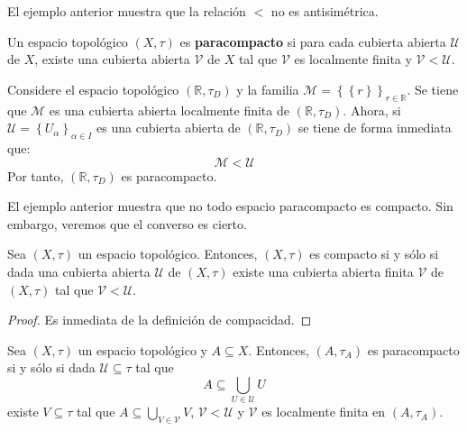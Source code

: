 \documentclass[12pt]{report}
\newcounter{it}
\theoremstyle{largebreak}
\begin{document}
    El ejemplo anterior muestra que la relación $<$ no es antisimétrica.

    \begin{mydef}
        Un espacio topológico $(X,\tau)$ es \textbf{paracompacto} si para cada cubierta abierta $\mathcal{U}$ de $X$, existe una cubierta abierta $\mathcal{V}$ de $X$ tal que $\mathcal{V}$ es localmente finita y $\mathcal{V}<\mathcal{U}$. 
    \end{mydef}

    \begin{exa}
        Considere el espacio topológico $(\mathbb{R},\tau_D)$ y la familia $\mathcal{M}=\left\{\left\{r\right\} \right\}_{ r\in \mathbb{R}}$. Se tiene que $\mathcal{M}$ es una cubierta abierta localmente finita de $(\mathbb{R},\tau_D)$. Ahora, si $\mathcal{U}=\left\{U_\alpha \right\}_{\alpha\in I}$ es una cubierta abierta de $(\mathbb{R},\tau_D)$ se tiene de forma inmediata que:
        \begin{equation*}
            \mathcal{M}<\mathcal{U}
        \end{equation*}
        Por tanto, $(\mathbb{R},\tau_D)$ es paracompacto.
    \end{exa}

    El ejemplo anterior muestra que no todo espacio paracompacto es compacto. Sin embargo, veremos que el converso es cierto.

    \begin{excer}
        Sea $(X,\tau)$ un espacio topológico. Entonces, $(X,\tau)$ es compacto si y sólo si dada una cubierta abierta $\mathcal{U}$ de $(X,\tau)$ existe una cubierta abierta finita $\mathcal{V}$ de $(X,\tau)$ tal que $\mathcal{V}<\mathcal{U}$.
    \end{excer}

    \begin{proof}
        Es inmediata de la definición de compacidad.
    \end{proof}

    \begin{propo}
        Sea $(X,\tau)$ un espacio topológico y $A\subseteq X$. Entonces, $(A,\tau_A)$ es paracompacto si y sólo si dada $\mathcal{U}\subseteq\tau$ tal que
        \begin{equation*}
            A\subseteq\bigcup_{ U\in\mathcal{U}}U
        \end{equation*}
        existe $V\subseteq\tau$ tal que $A\subseteq\bigcup_{ V\in\mathcal{V}}V$, $\mathcal{V}<\mathcal{U}$ y $\mathcal{V}$ es localmente finita en $(A,\tau_A)$.
    \end{propo}
\end{document}

